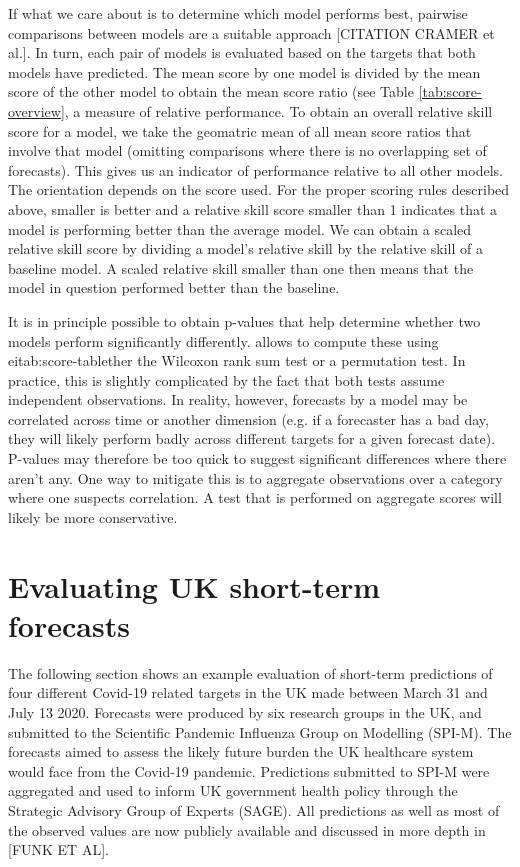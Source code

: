 \documentclass[article,shortnames]{jss}
\begin{document}
If what we care about is to determine which model performs best, pairwise comparisons between models are a suitable approach [CITATION CRAMER et al.]. In turn, each pair of models is evaluated based on the targets that both models have predicted. The mean score by one model is divided by the mean score of the other model to obtain the mean score ratio (see Table \ref{tab:score-overview}, a measure of relative performance. To obtain an overall relative skill score for a model, we take the geomatric mean of all mean score ratios that involve that model  (omitting comparisons where there is no overlapping set of forecasts). This gives us an indicator of performance relative to all other models. The orientation depends on the score used. For the proper scoring rules described above, smaller is better and a relative skill score smaller than 1 indicates that a model is performing better than the average model. We can obtain a scaled relative skill score by dividing a model's relative skill by the relative skill of a baseline model. A scaled relative skill smaller than one then means that the model in question performed better than the baseline. 

It is in principle possible to obtain p-values that help determine whether two models perform significantly differently.  allows to compute these using eitab:score-tablether the Wilcoxon rank sum test or a permutation test. In practice, this is slightly complicated by the fact that both tests assume independent observations. In reality, however, forecasts by a model may be correlated across time or another dimension (e.g. if a forecaster has a bad day, they will likely perform badly across different targets for a given forecast date). P-values may therefore be too quick to suggest significant differences where there aren't any. One way to mitigate this is to aggregate observations over a category where one suspects correlation. A test that is performed on aggregate scores will likely be more conservative. 



\section{Evaluating UK short-term forecasts}

The following section shows an example evaluation of short-term predictions of four different Covid-19 related targets in the UK made between March 31 and July 13 2020. Forecasts were produced by six research groups in the UK, and submitted to the Scientific Pandemic Influenza Group on Modelling (SPI-M). The forecasts aimed to assess the likely future burden the UK healthcare system would face from the Covid-19 pandemic. Predictions submitted to SPI-M were aggregated and used to inform UK government health policy through the Strategic Advisory Group of Experts (SAGE). All predictions as well as most of the observed values are now publicly available and discussed in more depth in [FUNK ET AL]. 
\end{document}
